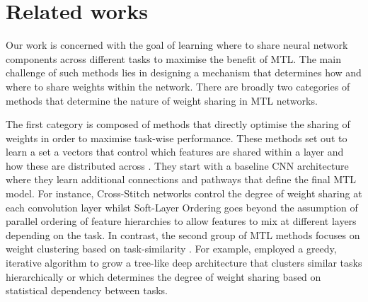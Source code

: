 


\section{Related works}
\vspace{-2mm}
Our work is concerned with the goal of learning where to share neural network components across different tasks to maximise the benefit of MTL. The main challenge of such methods lies in designing a mechanism that determines how and where to share weights within the network. There are broadly two categories of methods that determine the nature of weight sharing in MTL networks.

The first category is composed of methods that directly optimise the sharing of weights in order to maximise task-wise performance. These methods set out to learn a set a vectors that control which features are shared within a layer and how these are distributed across \cite{long2017learning, meyerson2018beyond, MisraCrossMTL16, Ruder2019SluiceNL}. They start with a baseline CNN architecture where they learn additional connections and pathways that define the final MTL model. For instance, Cross-Stitch networks \cite{MisraCrossMTL16} control the degree of weight sharing at each convolution layer whilst Soft-Layer Ordering \cite{meyerson2018beyond} goes beyond the assumption of parallel ordering of feature hierarchies to allow features to mix at different layers depending on the task. In contrast, the second group of MTL methods focuses on weight clustering based on task-similarity \cite{xue2007multi, jacob2009, Kang2011,lu2017fully,mejjati2018multi}. For example, \cite{lu2017fully} employed a greedy, iterative algorithm to grow a tree-like deep architecture that clusters similar tasks hierarchically or \cite{mejjati2018multi} which determines the degree of weight sharing based on statistical dependency between tasks.

